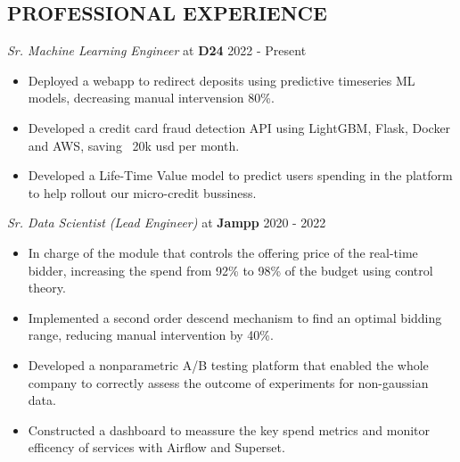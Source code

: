 \documentclass[margin]{res}
\begin{document}
\begin{resume}
    \section{PROFESSIONAL EXPERIENCE} 
    {\sl Sr. Machine Learning Engineer} at {\bf D24} \hfill 2022 - Present
    \begin{itemize}  \itemsep -2pt %
        \item Deployed a webapp to redirect deposits using predictive timeseries ML models, decreasing
            manual intervension 80\%.
        \item Developed a credit card fraud detection API using LightGBM, Flask, Docker and AWS, 
            saving ~20k usd per month.
        \item Developed a Life-Time Value model to predict users spending in the platform to help rollout our micro-credit bussiness.
    \end{itemize}
    {\sl Sr. Data Scientist (Lead Engineer)} at {\bf Jampp} \hfill 2020 - 2022
    \begin{itemize}  \itemsep -2pt %
        \item In charge of the module that controls the offering price of the
            real-time bidder, increasing the spend from 92\% to 98\%
            of the budget using control theory.
        \item Implemented a second order descend mechanism to find an optimal bidding range,
            reducing manual intervention by 40\%.
        \item Developed a nonparametric A/B testing platform that enabled the whole company to 
            correctly assess the outcome of experiments for non-gaussian data. 
        \item Constructed a dashboard to meassure the key spend metrics and monitor
            efficency of services with Airflow and Superset.

\end{itemize}
\end{resume}
\end{document}
